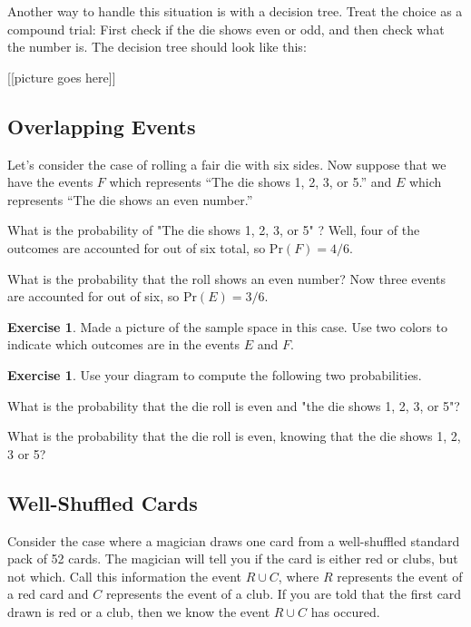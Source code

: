 \documentclass[12pt,letterpaper]{article}
\theoremstyle{definition}
\newtheorem{exercise}[question]{Exercise}
\begin{document}
Another way to handle this situation is with a decision tree. Treat the choice as a compound trial: First check if the die shows even or odd, and then check what the number is.
The decision tree should look like this:

[[picture goes here]]



\subsection*{Overlapping Events}
Let's consider the case of rolling a fair die with six sides.
Now suppose that we have the events $F$ which represents ``The die shows 1, 2, 3, or 5.'' and $E$ which represents ``The die shows an even number.''

What is the probability of "The die shows 1, 2, 3, or 5" ? Well, four of the outcomes are accounted for out of six total, so $\mathrm{Pr}(F) = 4/6$.

What is the probability that the roll shows an even number? Now three events are accounted for out of six, so $\mathrm{Pr}(E)=3/6$.


\begin{exercise}
Made a picture of the sample space in this case. Use two colors to indicate which outcomes are in the events $E$ and $F$.
\end{exercise}

\begin{exercise}
Use your diagram to compute the following two probabilities.
\begin{compactitem}
\item What is the probability that the die roll is even and "the die shows 1, 2, 3, or 5"?
\item What is the probability that the die roll is even, knowing that the die shows 1, 2, 3 or 5?
\end{compactitem}
\end{exercise}

\subsection*{Well-Shuffled Cards}
Consider the case where a magician draws one card from a well-shuffled standard pack of 52 cards. The magician will tell you if the card is either red or clubs, but not which. Call this information the event $R\cup C$, where $R$ represents the event of a red card and $C$ represents the event of a club. If you are told that the first card drawn is red or a club, then we know the event $R\cup C$ has occured.
\end{document}
